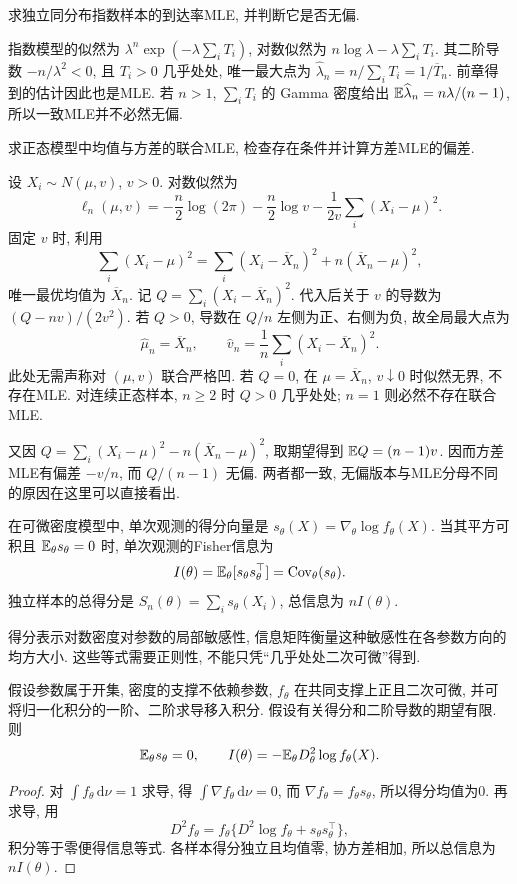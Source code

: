 \begin{example}
求独立同分布指数样本的到达率MLE, 并判断它是否无偏.
\end{example}
\begin{solution}
指数模型的似然为 $\lambda^n\exp(-\lambda\sum_iT_i)$, 对数似然为 $n\log\lambda-\lambda\sum_iT_i$. 其二阶导数 $-n/\lambda^2<0$, 且 $T_i>0$ 几乎处处, 唯一最大点为 $\widehat\lambda_n=n/\sum_iT_i=1/\overline T_n$. 前章得到的估计因此也是MLE. 若 $n>1$, $\sum_iT_i$ 的 Gamma 密度给出 $\mathbb E\widehat\lambda_n=n\lambda/(n-1)$, 所以一致MLE并不必然无偏.
\end{solution}

\begin{example}
求正态模型中均值与方差的联合MLE, 检查存在条件并计算方差MLE的偏差.
\end{example}
\begin{solution}
设 $X_i\sim N(\mu,v)$, $v>0$. 对数似然为
\[
 \ell_n(\mu,v)=-\frac n2\log(2\pi)-\frac n2\log v-
 \frac1{2v}\sum_i(X_i-\mu)^2.
\]
固定 $v$ 时, 利用
\[
 \sum_i(X_i-\mu)^2=\sum_i(X_i-\overline X_n)^2+n(\overline X_n-\mu)^2,
\]
唯一最优均值为 $\overline X_n$. 记 $Q=\sum_i(X_i-\overline X_n)^2$. 代入后关于 $v$ 的导数为 $(Q-nv)/(2v^2)$. 若 $Q>0$, 导数在 $Q/n$ 左侧为正、右侧为负, 故全局最大点为
\[
 \widehat\mu_n=\overline X_n,\qquad
 \widehat v_n=\frac1n\sum_i(X_i-\overline X_n)^2.
\]
此处无需声称对 $(\mu,v)$ 联合严格凹. 若 $Q=0$, 在 $\mu=\overline X_n$, $v\downarrow0$ 时似然无界, 不存在MLE. 对连续正态样本, $n\ge2$ 时 $Q>0$ 几乎处处; $n=1$ 则必然不存在联合MLE.

又因 $Q=\sum_i(X_i-\mu)^2-n(\overline X_n-\mu)^2$, 取期望得到 $\mathbb E Q=(n-1)v$. 因而方差MLE有偏差 $-v/n$, 而 $Q/(n-1)$ 无偏. 两者都一致, 无偏版本与MLE分母不同的原因在这里可以直接看出.
\end{solution}

\begin{definition}[得分与Fisher信息]
在可微密度模型中, 单次观测的得分向量是
$s_\theta(X)=\nabla_\theta\log f_\theta(X)$. 当其平方可积且 $\mathbb E_\theta s_\theta=0$ 时, 单次观测的Fisher信息为
\[
 I(\theta)=\mathbb E_\theta[s_\theta s_\theta^\top]=\operatorname{Cov}_\theta(s_\theta).
\]
独立样本的总得分是 $S_n(\theta)=\sum_i s_\theta(X_i)$, 总信息为 $nI(\theta)$.
\end{definition}
得分表示对数密度对参数的局部敏感性, 信息矩阵衡量这种敏感性在各参数方向的均方大小. 这些等式需要正则性, 不能只凭“几乎处处二次可微”得到.

\begin{proposition}[信息的两个表达式]
假设参数属于开集, 密度的支撑不依赖参数, $f_\theta$ 在共同支撑上正且二次可微, 并可将归一化积分的一阶、二阶求导移入积分. 假设有关得分和二阶导数的期望有限. 则
\[
 \mathbb E_\theta s_\theta=0,\qquad
 I(\theta)=-\mathbb E_\theta D^2_\theta\log f_\theta(X).
\]
\end{proposition}
\begin{proof}
对 $\int f_\theta\,\mathrm d\nu=1$ 求导, 得 $\int\nabla f_\theta\,\mathrm d\nu=0$, 而 $\nabla f_\theta=f_\theta s_\theta$, 所以得分均值为0. 再求导, 用
\[
 D^2 f_\theta=f_\theta\{D^2\log f_\theta+s_\theta s_\theta^\top\},
\]
积分等于零便得信息等式. 各样本得分独立且均值零, 协方差相加, 所以总信息为 $nI(\theta)$.
\end{proof}

